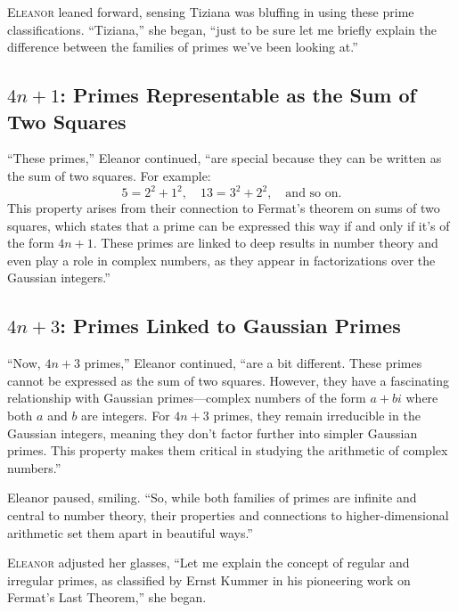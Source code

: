 
\newpage
\lettrine{E}{leanor} leaned forward, sensing Tiziana was bluffing in using these prime classifications. “Tiziana,” she began, “just to be sure let me briefly explain the difference between the families of primes we've been looking at.”

\subsection*{\( 4n+1 \): Primes Representable as the Sum of Two Squares}
“These primes,” Eleanor continued, “are special because they can be written as the sum of two squares. For example:
\[
5 = 2^2 + 1^2, \quad 13 = 3^2 + 2^2, \quad \text{and so on.}
\]
This property arises from their connection to Fermat’s theorem on sums of two squares, which states that a prime can be expressed this way if and only if it’s of the form \( 4n+1 \). These primes are linked to deep results in number theory and even play a role in complex numbers, as they appear in factorizations over the Gaussian integers.”

\subsection*{\( 4n+3 \): Primes Linked to Gaussian Primes}
“Now, \( 4n+3 \) primes,” Eleanor continued, “are a bit different. These primes cannot be expressed as the sum of two squares. However, they have a fascinating relationship with Gaussian primes—complex numbers of the form \( a + bi \) where both \( a \) and \( b \) are integers. For \( 4n+3 \) primes, they remain irreducible in the Gaussian integers, meaning they don’t factor further into simpler Gaussian primes. This property makes them critical in studying the arithmetic of complex numbers.”

Eleanor paused, smiling. “So, while both families of primes are infinite and central to number theory, their properties and connections to higher-dimensional arithmetic set them apart in beautiful ways.”
\newpage

\lettrine{E}{leanor} adjusted her glasses, “Let me explain the concept of regular and irregular primes, as classified by Ernst Kummer in his pioneering work on Fermat’s Last Theorem,” she began.

